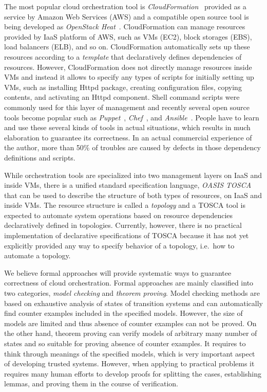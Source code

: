 \documentclass[12pt]{report}
\begin{document}
The most popular cloud orchestration tool is {\it
  CloudFormation}~\cite{CloudFormation} provided as a service by
Amazon Web Services (AWS) and a compatible open source tool is being
developed as {\it OpenStack Heat}~\cite{Heat}. CloudFormation can
manage resources provided by IaaS platform of AWS, such as VMs (EC2),
block storages (EBS), load balancers (ELB), and so on. CloudFormation
automatically sets up these resources according to a {\it template}
that declaratively defines dependencies of resources. However,
CloudFormation does not directly manage resources inside VMs and
instead it allows to specify any types of scripts for initially
setting up VMs, such as installing Httpd package, creating
configuration files, copying contents, and activating an Httpd
component. Shell command scripts were commonly used for this layer of
management and recently several open source tools become popular such
as {\it Puppet}~\cite{Puppet}, {\it Chef}~\cite{Chef}, and {\it
  Ansible}~\cite{Ansible}. People have to learn and use these
several kinds of tools in actual situations, which results in much
elaboration to guarantee its correctness. In an actual commercial
experience of the author, more than 50\% of troubles are caused by
defects in those dependency definitions and scripts.

While orchestration tools are specialized into two management layers
on IaaS and inside VMs, there is a unified standard specification
language, {\it OASIS TOSCA}~\cite{TOSCA} that can be used to describe
the structure of both types of resources, on IaaS and inside VMs. The
resource structure is called a {\it topology} and a TOSCA tool is
expected to automate system operations based on resource dependencies
declaratively defined in topologies.  Currently, however, there is no
practical implementation of declarative specifications of TOSCA
because it has not yet explicitly provided any way to specify behavior
of a topology, i.e.\ how to automate a topology.

We believe formal approaches will provide systematic ways to guarantee
correctness of cloud orchestration. Formal approaches are mainly
classified into two categories, {\it model checking} and {\it theorem
  proving}. Model checking methods are based on exhaustive analysis of
states of transition systems and can automatically find counter
examples included in the specified models. However, the size of models
are limited and thus absence of counter examples can not be proved.
On the other hand, theorem proving can verify models of arbitrary many
number of states and so suitable for proving absence of counter
examples. It requires to think through meanings of the specified
models, which is very important aspect of developing trusted
systems. However, when applying to practical problems it requires many
human efforts to develop proofs for splitting the cases, establishing
lemmas, and proving them in the course of verification.
\end{document}
